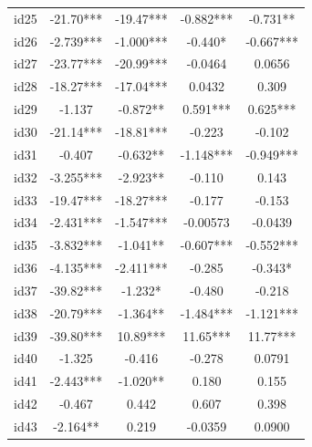 \documentclass[num-refs]{wiley-article}
\begin{document}
\begin{center}
\begin{longtable}{ccccc}
id25                     & -21.70*** & -19.47***      & -0.882***         & -0.731**          \\
id26                     & -2.739*** & -1.000***      & -0.440*           & -0.667***         \\
id27                     & -23.77*** & -20.99***      & -0.0464           & 0.0656            \\
id28                     & -18.27*** & -17.04***      & 0.0432            & 0.309             \\
id29                     & -1.137    & -0.872**       & 0.591***          & 0.625***          \\
id30                     & -21.14*** & -18.81***      & -0.223            & -0.102            \\
id31                     & -0.407    & -0.632**       & -1.148***         & -0.949***         \\
id32                     & -3.255*** & -2.923**       & -0.110            & 0.143             \\
id33                     & -19.47*** & -18.27***      & -0.177            & -0.153            \\
id34                     & -2.431*** & -1.547***      & -0.00573          & -0.0439           \\
id35                     & -3.832*** & -1.041**       & -0.607***         & -0.552***         \\
id36                     & -4.135*** & -2.411***      & -0.285            & -0.343*           \\
id37                     & -39.82*** & -1.232*        & -0.480            & -0.218            \\
id38                     & -20.79*** & -1.364**       & -1.484***         & -1.121***         \\
id39                     & -39.80*** & 10.89***       & 11.65***          & 11.77***          \\
id40                     & -1.325    & -0.416         & -0.278            & 0.0791            \\
id41                     & -2.443*** & -1.020**       & 0.180             & 0.155             \\
id42                     & -0.467    & 0.442          & 0.607             & 0.398             \\
id43                     & -2.164**  & 0.219          & -0.0359           & 0.0900            \\

\end{longtable}
\end{center}
\end{document}
